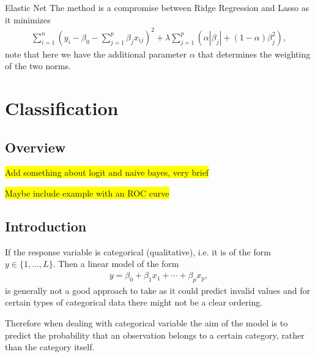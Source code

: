 \documentclass[aspectratio=169,10pt]{beamer}
\newcommand{\hl}[1]{%
  \begin{center}
    \colorbox{yellow}{#1}
  \end{center}
}
\begin{document}
\begin{frame}{\secname}{Elastic Net}
  The method is a compromise between Ridge Regression and Lasso as it minimizes
  \begin{align*}
    \sum_{i=1}^n \left( y_i - \beta_0 - \sum_{j=1}^p \beta_j x_{ij}\right)^2 + \lambda \sum_{j=1}^p \left(\alpha |\beta_j| + (1 - \alpha)\beta_j^2\right),
  \end{align*}
  note that here we have the additional parameter $\alpha$ that determines the weighting of the two norms.
\end{frame}

\section{Classification}

\subsection{Overview}
\begin{frame}{\secname}{\subsecname}
 \hl{Add something about logit and naive bayes, very brief}
 \hl{Maybe include example with an ROC curve}
\end{frame}

\subsection{Introduction}
\begin{frame}{\secname}{\subsecname}
  If the response variable is categorical (qualitative), i.e.\! it is of the form $y\in\{1,\ldots,L\}$. Then a linear model of the form
  \begin{align*}
    y = \beta_0 + \beta_1 x_1 + \cdots + \beta_px_p,
  \end{align*}
  is generally not a good approach to take as it could predict invalid values and for certain types of categorical data there might not be a clear ordering.
  
  Therefore when dealing with categorical variable the aim of the model is to predict the probability that an observation belongs to a certain category, rather than the category itself.
\end{frame}
\end{document}
